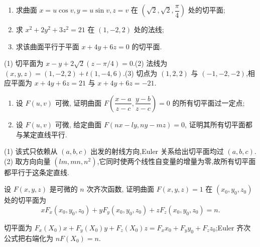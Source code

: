 \begin{example}
    \begin{enumerate}
        \item 求曲面 $x=u\cos v,y=u\sin v,z=v$ 在 $(\sqrt{2},\sqrt{2},\dfrac{\pi}{4})$ 处的切平面;
        \item 求 $x^2+2y^2+3z^2=21$ 在 $(1,-2,2)$ 处的法线;
        \item 求该曲面平行于平面 $x+4y+6z=0$ 的切平面.
    \end{enumerate}
\end{example}
\exampleblank

\begin{solution}

    (1) 切平面为 $x-y+2\sqrt{2}(z-\pi/4)=0$.(2) 法线为 $(x,y,z)=(1,-2,2)+t(1,-4,6)$.(3) 切点为 $(1,2,2)$ 与 $(-1,-2,-2)$,相应平面为 $x+4y+6z=21$ 与 $x+4y+6z=-21$.
\end{solution}

\begin{example}
    \begin{enumerate}
        \item 设 $F(u,v)$ 可微, 证明曲面 $\displaystyle F\left(\dfrac{x-a}{z-c},\dfrac{y-b}{z-c}\right)=0$ 的所有切平面过一定点;
        \item 设 $F(u,v)$ 可微, 给定曲面 $F(nx-ly,ny-mz)=0$, 证明其所有切平面都与某定直线平行.
    \end{enumerate}
\end{example}
\exampleblank

\begin{solution}

    (1) 该式只依赖从 $(a,b,c)$ 出发的射线方向,Euler 关系给出切平面均过 $(a,b,c)$.(2) 取方向向量 $(lm,mn,n^2)$,它同时使两个线性自变量的增量为零,故所有切平面都平行于这条定直线.
\end{solution}

\begin{example}
    设 $F(x,y,z)$ 是可微的 $n$ 次齐次函数, 证明曲面 $F(x,y,z)=1$ 在 $(x_0,y_0,z_0)$ 处的切平面为
    \[
        xF_x(x_0,y_0,z_0)+yF_y(x_0,y_0,z_0)+zF_z(x_0,y_0,z_0)=n.
    \]
\end{example}
\exampleblank

\begin{solution}
    切平面为 $F_x(X_0)x+F_y(X_0)y+F_z(X_0)z=F_xx_0+F_yy_0+F_zz_0$;Euler 齐次公式把右端化为 $nF(X_0)=n$.
\end{solution}



